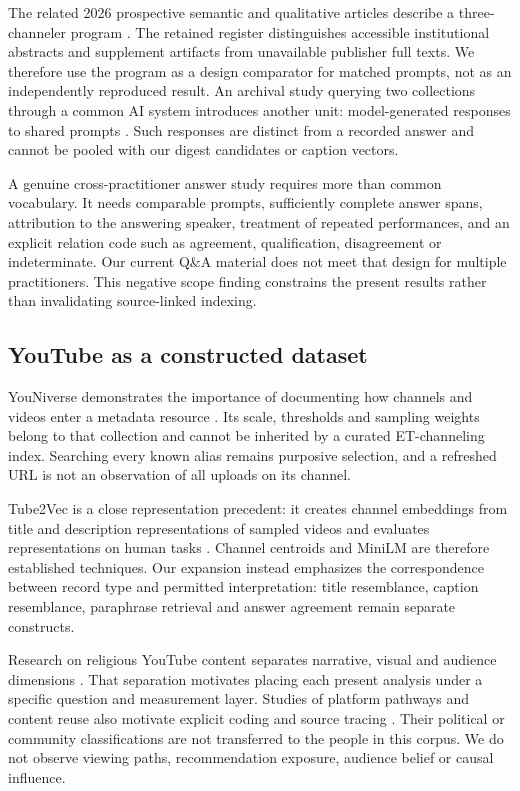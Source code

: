The related 2026 prospective semantic and qualitative articles describe a three-channeler program \citep{wahbeh2026semantic,wahbeh2026qualitative}. The retained register distinguishes accessible institutional abstracts and supplement artifacts from unavailable publisher full texts. We therefore use the program as a design comparator for matched prompts, not as an independently reproduced result. An archival study querying two collections through a common AI system introduces another unit: model-generated responses to shared prompts \citep{wahbeh2026records}. Such responses are distinct from a recorded answer and cannot be pooled with our digest candidates or caption vectors.

A genuine cross-practitioner answer study requires more than common vocabulary. It needs comparable prompts, sufficiently complete answer spans, attribution to the answering speaker, treatment of repeated performances, and an explicit relation code such as agreement, qualification, disagreement or indeterminate. Our current Q\&A material does not meet that design for multiple practitioners. This negative scope finding constrains the present results rather than invalidating source-linked indexing.

\subsection{YouTube as a constructed dataset}
YouNiverse demonstrates the importance of documenting how channels and videos enter a metadata resource \citep{ribeiro2021youniverse}. Its scale, thresholds and sampling weights belong to that collection and cannot be inherited by a curated ET-channeling index. Searching every known alias remains purposive selection, and a refreshed URL is not an observation of all uploads on its channel.

Tube2Vec is a close representation precedent: it creates channel embeddings from title and description representations of sampled videos and evaluates representations on human tasks \citep{boesinger2024tube2vec}. Channel centroids and MiniLM are therefore established techniques. Our expansion instead emphasizes the correspondence between record type and permitted interpretation: title resemblance, caption resemblance, paraphrase retrieval and answer agreement remain separate constructs.

Research on religious YouTube content separates narrative, visual and audience dimensions \citep{chen2026digital}. That separation motivates placing each present analysis under a specific question and measurement layer. Studies of platform pathways and content reuse also motivate explicit coding and source tracing \citep{ota2025pathways,starbird2018ecosystem}. Their political or community classifications are not transferred to the people in this corpus. We do not observe viewing paths, recommendation exposure, audience belief or causal influence.

